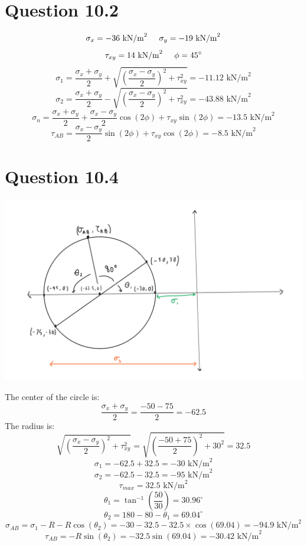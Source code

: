 \documentclass{article}
\begin{document}
\section*{Question 10.2}
\[\sigma_x=-36\text{ kN/m}^2\hspace{5mm}\sigma_y=-19\text{ kN/m}^2\]
\[\tau_{xy}=14\text{ kN/m}^2\hspace{5mm}\phi=45^\circ\]  
\[\sigma_1=\frac{\sigma_x+\sigma_y}{2}+\sqrt{\left(\frac{\sigma_x-\sigma_y}{2}\right)^2+\tau_{xy}^2}=\boxed{-11.12\text{ kN/m}^2}\]
\[\sigma_2=\frac{\sigma_x+\sigma_y}{2}-\sqrt{\left(\frac{\sigma_x-\sigma_y}{2}\right)^2+\tau_{xy}^2}=\boxed{-43.88\text{ kN/m}^2}\]
\[\sigma_n=\frac{\sigma_x+\sigma_y}{2}+\frac{\sigma_x-\sigma_y}{2}\cos(2\phi)+\tau_{xy}\sin(2\phi)=\boxed{-13.5\text{ kN/m}^2}\]
\[\tau_{AB}=\frac{\sigma_x-\sigma_y}{2}\sin(2\phi)+\tau_{xy}\cos(2\phi)=\boxed{-8.5 \text{ kN/m}^2}\]
\section*{Question 10.4}
\begin{center}
    \includegraphics*[scale=0.4]{fig1.png} 
\end{center}
The center of the circle is:
\[\frac{\sigma_x+\sigma_y}{2}=\frac{-50-75}{2}=-62.5\]
The radius is: 
\[\sqrt{\left(\frac{\sigma_x-\sigma_y}{2}\right)^2+\tau_{xy}^2}=\sqrt{\left(\frac{-50+75}{2}\right)^2+30^2}=32.5\]
\[\sigma_1=-62.5+32.5=\boxed{-30 \text{ kN/m}^2}\] 
\[\sigma_2=-62.5-32.5=\boxed{-95 \text{ kN/m}^2}\]
\[\tau_{max}=\boxed{32.5\text{ kN/m}^2}\]
\[\theta_1=\tan^{-1}\left(\frac{50}{30}\right)=30.96^\circ\]
\[\theta_2=180-80-\theta_1=69.04^\circ\]
\[\sigma_{AB}=\sigma_1-R-R\cos(\theta_2)=-30-32.5-32.5\times\cos(69.04)=\boxed{-94.9\text{ kN/m}^2}\] 
\[\tau_{AB}=-R\sin(\theta_2)=-32.5\sin(69.04)=\boxed{-30.42\text{ kN/m}^2}\]
\end{document}
